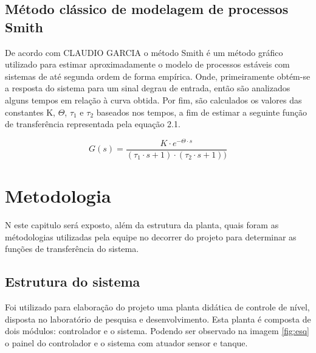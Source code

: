 \section{Método clássico de modelagem de processos Smith}

\hspace{11mm} De acordo com CLAUDIO GARCIA o método Smith é um método gráfico utilizado para estimar aproximadamente o modelo de processos estáveis com sistemas de até segunda ordem de forma empírica. Onde, primeiramente obtém-se a resposta do sistema para um sinal degrau de entrada, então são analizados alguns tempos em relação à curva obtida. Por fim, são calculados os valores das constantes K, $\Theta$, $\tau_1$ e $\tau_2$ baseados nos tempos, a fim de estimar a seguinte função de transferência representada pela equação 2.1.

\begin{equation}
    G(s) =  \dfrac{K \cdot e^{-\Theta \cdot s}}{(\tau_1 \cdot s + 1)\cdot (\tau_2 \cdot s + 1))}
\end{equation} 


\chapter{Metodologia}

\lettrine[lines=3]{N}{} este capitulo será exposto, além da estrutura da planta, quais foram as métodologias utilizadas pela equipe no decorrer do projeto para determinar as funções de transferência do sistema. 

\section{Estrutura do sistema}

\hspace{11mm} Foi utilizado para elaboração do projeto uma planta didática de controle de nível, disposta no laboratório de pesquisa e desenvolvimento. Esta planta é composta de dois módulos: controlador e o sistema. Podendo ser observado na imagem \ref{fig:esq} o painel do controlador e o sistema com atuador sensor e tanque.


